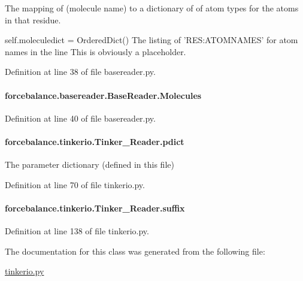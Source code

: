 The mapping of (molecule name) to a dictionary of of atom types for the atoms in that residue. 

self.\-moleculedict = Ordered\-Dict() The listing of 'R\-E\-S\-:A\-T\-O\-M\-N\-A\-M\-E\-S' for atom names in the line This is obviously a placeholder. 

Definition at line 38 of file basereader.\-py.

\hypertarget{classforcebalance_1_1basereader_1_1BaseReader_ad2842550aa690f1cd82e41ec8d6fe541}{
\paragraph[{Molecules}]{\setlength{\rightskip}{0pt plus 5cm}forcebalance.\-basereader.\-Base\-Reader.\-Molecules\hspace{0.3cm}{\ttfamily [inherited]}}}\label{classforcebalance_1_1basereader_1_1BaseReader_ad2842550aa690f1cd82e41ec8d6fe541}


Definition at line 40 of file basereader.\-py.

\hypertarget{classforcebalance_1_1tinkerio_1_1Tinker__Reader_a357973ff305fe5135067499292f32a37}{
\paragraph[{pdict}]{\setlength{\rightskip}{0pt plus 5cm}forcebalance.\-tinkerio.\-Tinker\-\_\-\-Reader.\-pdict}}\label{classforcebalance_1_1tinkerio_1_1Tinker__Reader_a357973ff305fe5135067499292f32a37}


The parameter dictionary (defined in this file) 



Definition at line 70 of file tinkerio.\-py.

\hypertarget{classforcebalance_1_1tinkerio_1_1Tinker__Reader_ad9a91824cf94ed13b39a115ebbd784c3}{
\paragraph[{suffix}]{\setlength{\rightskip}{0pt plus 5cm}forcebalance.\-tinkerio.\-Tinker\-\_\-\-Reader.\-suffix}}\label{classforcebalance_1_1tinkerio_1_1Tinker__Reader_ad9a91824cf94ed13b39a115ebbd784c3}


Definition at line 138 of file tinkerio.\-py.



The documentation for this class was generated from the following file\-:\begin{DoxyCompactItemize}
\item 
\hyperlink{tinkerio_8py}{tinkerio.\-py}\end{DoxyCompactItemize}
